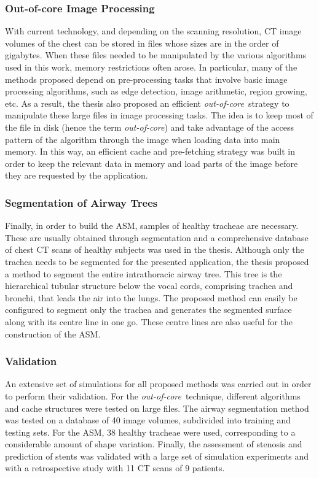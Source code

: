 \documentclass[a4paper]{article}
\newcommand{\outcore}{\textit{out-of-core}}
\begin{document}
\subsubsection{Out-of-core Image Processing}

With current technology, and depending on the scanning resolution, CT image volumes of the chest can be stored in files whose sizes are in the order of gigabytes. When these files needed to be manipulated by the various algorithms used in this work, memory restrictions often arose. In particular, many of the methods proposed depend on pre-processing tasks that involve basic image processing algorithms, such as edge detection, image arithmetic, region growing, etc. As a result, the thesis also proposed an efficient \outcore\ strategy to manipulate these large files in image processing tasks. The idea is to keep most of the file in disk (hence the term \outcore) and take advantage of the access pattern of the algorithm through the image when loading data into main memory. In this way, an efficient cache and pre-fetching strategy was built in order to keep the relevant data in memory and load parts of the image before they are requested by the application. 

\subsubsection{Segmentation of Airway Trees}

Finally, in order to build the ASM, samples of healthy tracheae are necessary. These are usually obtained through segmentation and a comprehensive database of chest CT scans of healthy subjects was used in the thesis. Although only the trachea needs to be segmented for the presented application, the thesis proposed a method to segment the entire intrathoracic airway tree. This tree is the hierarchical tubular structure below the vocal cords, comprising trachea and bronchi, that leads the air into the lungs. The proposed method can easily be configured to segment only the trachea and generates the segmented surface along with its centre line in one go. These centre lines are also useful for the construction of the ASM. 

\subsubsection{Validation}

An extensive set of simulations for all proposed methods was carried out in order to perform their validation. For the \outcore\ technique, different algorithms and cache structures were tested on large files. The airway segmentation method was tested on a database of 40 image volumes, subdivided into training and testing sets. For the ASM, 38 healthy tracheae were used, corresponding to a considerable amount of shape variation. Finally, the assessment of stenosis and prediction of stents was validated with a large set of simulation experiments and with a retrospective study with 11 CT scans of 9 patients.
\end{document}
